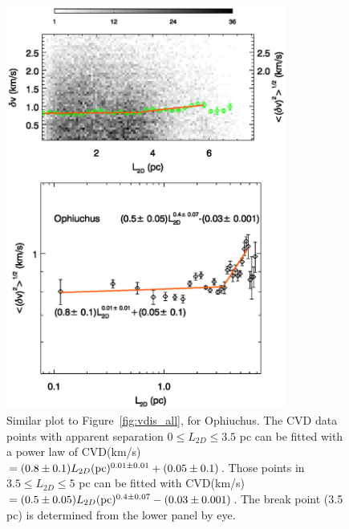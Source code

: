 \documentclass[iop,revtex4]{emulateapj}
\begin{document}
\begin{figure}[htbp]
\begin{minipage}[b]{0.45\textwidth}
  \includegraphics[width=9.2cm]{oph_vdis_all_all.eps}
\end{minipage}
\caption{Similar plot to Figure~\ref{fig:vdis_all}, for Ophiuchus. The CVD data points with apparent separation $0\leq L_{2D} \leq 3.5$  pc can be fitted with a power law of CVD(km/s)$=(0.8\pm 0.1)L_{2D} ({\rm pc})^{0.01\pm 0.01}+(0.05\pm 0.1)$. Those points in $3.5\leq L_{2D} \leq 5$  pc can be fitted with CVD(km/s)$=(0.5\pm 0.05)L_{2D} ({\rm pc})^{0.4\pm 0.07}-(0.03\pm 0.001)$. The break point (3.5 pc) is determined from the lower panel by eye.}\label{fig:oph_vdis_all}
\end{figure}
\end{document}
